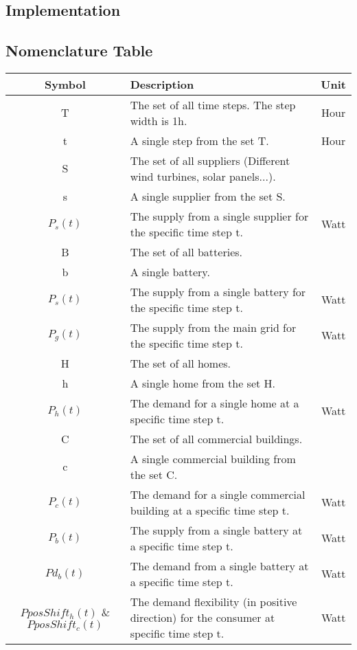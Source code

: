 \subsection{Implementation}


\subsection{Nomenclature Table}
	\begin{longtable}{|c|p{}|c|}
		\toprule
		\textbf{Symbol} & \textbf{Description} & \textbf{Unit} \\ \midrule
		T & The set of all time steps. The step width is 1h. & Hour \\ \midrule
		t & A single step from the set T. & Hour \\ \midrule
		S & The set of all suppliers (Different wind turbines, solar panels...). &  \\ \midrule
		s & A single supplier from the set S. & \\ \midrule
		$P_{s}(t)$ & The supply from a single supplier for the specific time step t. & Watt\\ \midrule
		B & The set of all batteries. & \\ \midrule
		b & A single battery. & \\ \midrule
		$P_{s}(t)$ & The supply from a single battery for the specific time step t. & Watt \\ \midrule
		$P_{g}(t)$ & The supply from the main grid for the specific time step t. & Watt \\ \midrule
		H & The set of all homes. & \\ \midrule
		h & A single home from the set H. & \\ \midrule
		$P_{h}(t)$ & The demand for a single home at a specific time step t. & Watt\\ \midrule
		C & The set of all commercial buildings. & \\ \midrule
		c & A single commercial building from the set C. & \\ \midrule
		$P_{c}(t)$ & The demand for a single commercial building at a specific time step t. & Watt \\ \midrule
		$P_{b}(t)$ & The supply from a single battery at a specific time step t. & Watt \\ \midrule
		$Pd_{b}(t)$ & The demand from a single battery at a specific time step t. & Watt \\ \midrule
		$PposShift_{h}(t)$ \& $PposShift_{c}(t)$ & The demand flexibility (in positive direction) for the consumer at specific time step t. & Watt \\ \midrule

\end{longtable}

